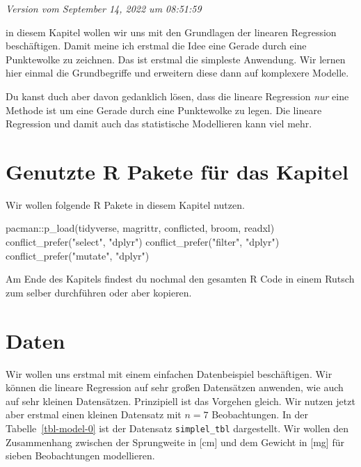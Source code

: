 \documentclass[
  letterpaper,
]{scrbook}
\newenvironment{Shaded}{\begin{snugshade}}{\end{snugshade}}
\newcommand{\FunctionTok}[1]{\textcolor[rgb]{0.28,0.35,0.67}{#1}}
\newcommand{\NormalTok}[1]{\textcolor[rgb]{0.00,0.23,0.31}{#1}}
\newcommand{\SpecialCharTok}[1]{\textcolor[rgb]{0.37,0.37,0.37}{#1}}
\newcommand{\StringTok}[1]{\textcolor[rgb]{0.13,0.47,0.30}{#1}}
\begin{document}
\emph{Version vom September 14, 2022 um 08:51:59}

in diesem Kapitel wollen wir uns mit den Grundlagen der linearen
Regression beschäftigen. Damit meine ich erstmal die Idee eine Gerade
durch eine Punktewolke zu zeichnen. Das ist erstmal die simpleste
Anwendung. Wir lernen hier einmal die Grundbegriffe und erweitern diese
dann auf komplexere Modelle.

Du kanst duch aber davon gedanklich lösen, dass die lineare Regression
\emph{nur} eine Methode ist um eine Gerade durch eine Punktewolke zu
legen. Die lineare Regression und damit auch das statistische
Modellieren kann viel mehr.

\hypertarget{genutzte-r-pakete-fuxfcr-das-kapitel-15}{%
\section{Genutzte R Pakete für das
Kapitel}\label{genutzte-r-pakete-fuxfcr-das-kapitel-15}}

Wir wollen folgende R Pakete in diesem Kapitel nutzen.

\begin{Shaded}
\begin{Highlighting}[]
\NormalTok{pacman}\SpecialCharTok{::}\FunctionTok{p\_load}\NormalTok{(tidyverse, magrittr, conflicted, broom,}
\NormalTok{               readxl)}
\FunctionTok{conflict\_prefer}\NormalTok{(}\StringTok{"select"}\NormalTok{, }\StringTok{"dplyr"}\NormalTok{)}
\FunctionTok{conflict\_prefer}\NormalTok{(}\StringTok{"filter"}\NormalTok{, }\StringTok{"dplyr"}\NormalTok{)}
\FunctionTok{conflict\_prefer}\NormalTok{(}\StringTok{"mutate"}\NormalTok{, }\StringTok{"dplyr"}\NormalTok{)}
\end{Highlighting}
\end{Shaded}

Am Ende des Kapitels findest du nochmal den gesamten R Code in einem
Rutsch zum selber durchführen oder aber kopieren.

\hypertarget{daten-3}{%
\section{Daten}\label{daten-3}}

Wir wollen uns erstmal mit einem einfachen Datenbeispiel beschäftigen.
Wir können die lineare Regression auf sehr großen Datensätzen anwenden,
wie auch auf sehr kleinen Datensätzen. Prinzipiell ist das Vorgehen
gleich. Wir nutzen jetzt aber erstmal einen kleinen Datensatz mit
\(n=7\) Beobachtungen. In der Tabelle~\ref{tbl-model-0} ist der
Datensatz \texttt{simplel\_tbl} dargestellt. Wir wollen den Zusammenhang
zwischen der Sprungweite in {[}cm{]} und dem Gewicht in {[}mg{]} für
sieben Beobachtungen modellieren.
\end{document}
